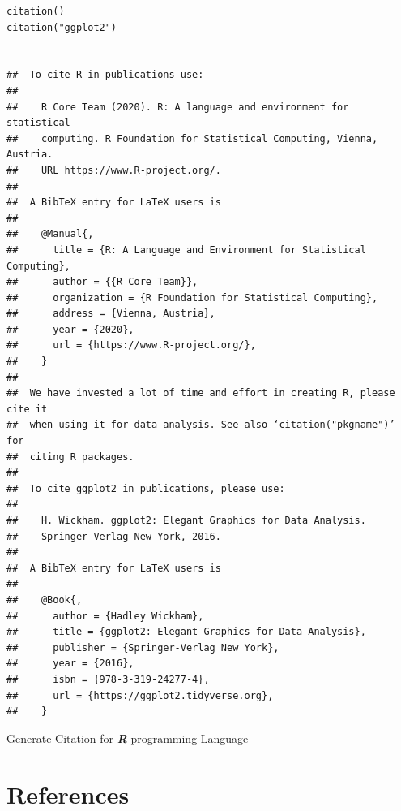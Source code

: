 \documentclass[11pt]{article}
\begin{document}
\begin{listing}[htbp]
\begin{verbatim}
citation()
citation("ggplot2")


##  To cite R in publications use:
##
##    R Core Team (2020). R: A language and environment for statistical
##    computing. R Foundation for Statistical Computing, Vienna, Austria.
##    URL https://www.R-project.org/.
##
##  A BibTeX entry for LaTeX users is
##
##    @Manual{,
##      title = {R: A Language and Environment for Statistical Computing},
##      author = {{R Core Team}},
##      organization = {R Foundation for Statistical Computing},
##      address = {Vienna, Austria},
##      year = {2020},
##      url = {https://www.R-project.org/},
##    }
##
##  We have invested a lot of time and effort in creating R, please cite it
##  when using it for data analysis. See also ‘citation("pkgname")’ for
##  citing R packages.
##
##  To cite ggplot2 in publications, please use:
##
##    H. Wickham. ggplot2: Elegant Graphics for Data Analysis.
##    Springer-Verlag New York, 2016.
##
##  A BibTeX entry for LaTeX users is
##
##    @Book{,
##      author = {Hadley Wickham},
##      title = {ggplot2: Elegant Graphics for Data Analysis},
##      publisher = {Springer-Verlag New York},
##      year = {2016},
##      isbn = {978-3-319-24277-4},
##      url = {https://ggplot2.tidyverse.org},
##    }
\end{verbatim}
\caption{\label{orgc761d89}Generate Citation for \textbf{\emph{R}} programming Language}
\end{listing}

\section{References}
\label{sec:org63fafc1}
\end{document}
